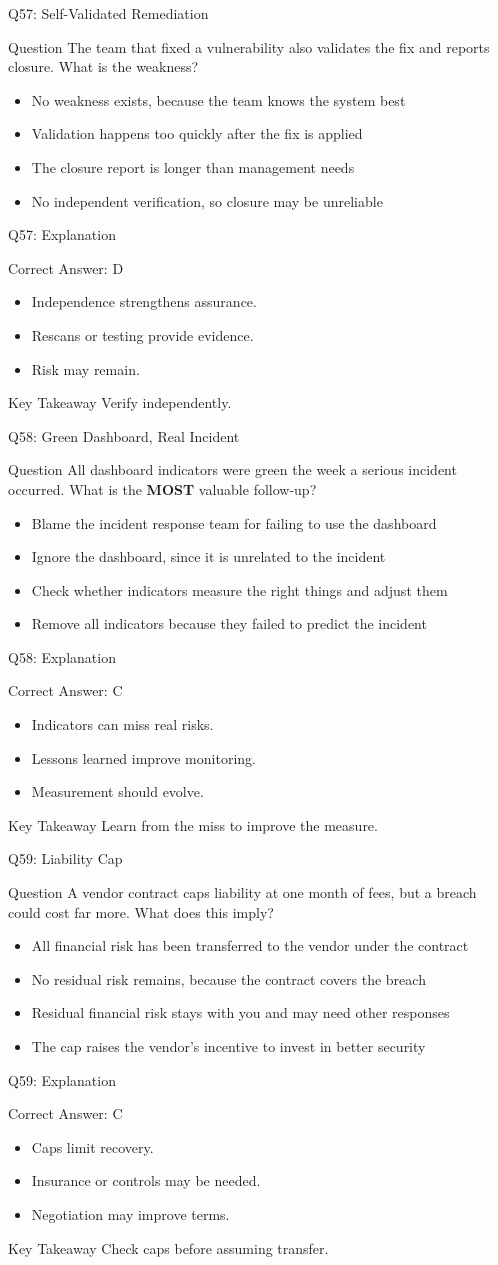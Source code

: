 \documentclass[aspectratio=169]{beamer}
\newcommand{\hq}[7]{%
	\begin{frame}{Q#1: #2}
		\begin{block}{Question}
			#3
		\end{block}
		\begin{itemize}
			#4
		\end{itemize}
	\end{frame}
	\begin{frame}{Q#1: Explanation}
		\begin{block}{Correct Answer: #5}
			\begin{itemize}
				#6
			\end{itemize}
		\end{block}
		\begin{alertblock}{Key Takeaway}
			#7
		\end{alertblock}
	\end{frame}
}
\begin{document}
	\hq{57}{Self-Validated Remediation}
	{The team that fixed a vulnerability also validates the fix and reports closure. What is the weakness?}
	{\item[\textbf{(A)}] No weakness exists, because the team knows the system best
		\item[\textbf{(B)}] Validation happens too quickly after the fix is applied
		\item[\textbf{(C)}] The closure report is longer than management needs
		\item[\textbf{(D)}] No independent verification, so closure may be unreliable}
	{D}
	{\item Independence strengthens assurance.
		\item Rescans or testing provide evidence.
		\item Risk may remain.}
	{Verify independently.}

	\hq{58}{Green Dashboard, Real Incident}
	{All dashboard indicators were green the week a serious incident occurred. What is the \textbf{MOST} valuable follow-up?}
	{\item[\textbf{(A)}] Blame the incident response team for failing to use the dashboard
		\item[\textbf{(B)}] Ignore the dashboard, since it is unrelated to the incident
		\item[\textbf{(C)}] Check whether indicators measure the right things and adjust them
		\item[\textbf{(D)}] Remove all indicators because they failed to predict the incident}
	{C}
	{\item Indicators can miss real risks.
		\item Lessons learned improve monitoring.
		\item Measurement should evolve.}
	{Learn from the miss to improve the measure.}

	\hq{59}{Liability Cap}
	{A vendor contract caps liability at one month of fees, but a breach could cost far more. What does this imply?}
	{\item[\textbf{(A)}] All financial risk has been transferred to the vendor under the contract
		\item[\textbf{(B)}] No residual risk remains, because the contract covers the breach
		\item[\textbf{(C)}] Residual financial risk stays with you and may need other responses
		\item[\textbf{(D)}] The cap raises the vendor's incentive to invest in better security}
	{C}
	{\item Caps limit recovery.
		\item Insurance or controls may be needed.
		\item Negotiation may improve terms.}
	{Check caps before assuming transfer.}
\end{document}
